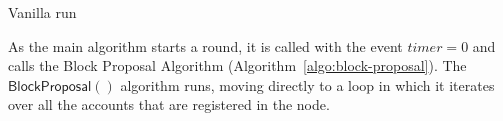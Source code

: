 \documentclass[10pt,a4paper]{article}
\begin{document}
\begin{section}{Vanilla run}
    
    
    
    As the main algorithm starts a round, it is called with the event $timer=0$ and
    calls the Block Proposal Algorithm (Algorithm~\ref{algo:block-proposal}).
    The $\mathsf{BlockProposal}()$ algorithm runs, moving directly to a loop in which it
    iterates over all the accounts that are registered in the node.
    

\end{section}
\end{document}
